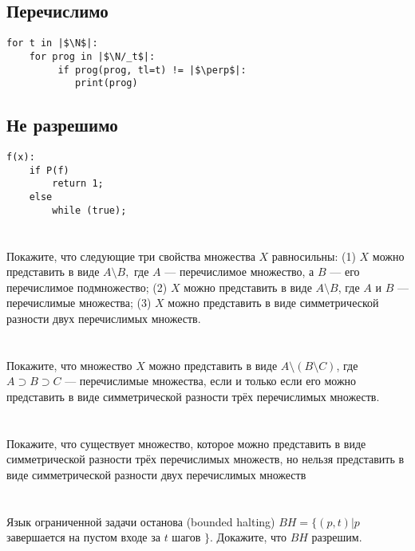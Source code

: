 \subsection{Перечислимо}
\begin{verbatim}
for t in |$\N$|:
    for prog in |$\N/_t$|:
         if prog(prog, tl=t) != |$\perp$|:
            print(prog)
\end{verbatim}

\subsection{Не разрешимо}

\begin{verbatim}
f(x):
    if P(f)
        return 1;
    else
        while (true);
    \end{verbatim}

\section{}
Покажите, что следующие три свойства множества $X$ равносильны: (1) $X$ можно представить в виде $A \setminus B,$ где $A$ — перечислимое множество, а $B$ — его перечислимое подмножество; (2) $X$ можно представить в виде $A \setminus B$, где $A$ и $B$ — перечислимые множества; (3) $X$ можно представить в виде симметрической разности двух перечислимых множеств.

\section{}
Покажите, что множество $X$ можно представить в виде $A\setminus (B \setminus C)$, где $A \supset B \supset C$ — перечислимые множества, если и только если его можно представить в виде симметрической разности трёх перечислимых множеств.

\section{}
Покажите, что существует множество, которое можно представить в виде симметрической разности трёх перечислимых множеств, но нельзя представить в виде симметрической разности двух перечислимых множеств

\section{}
Язык ограниченной задачи останова (bounded halting) $BH = \{ (p, t) | p$ завершается на пустом входе за $t$ шагов $\}$. Докажите, что $BH$ разрешим.

